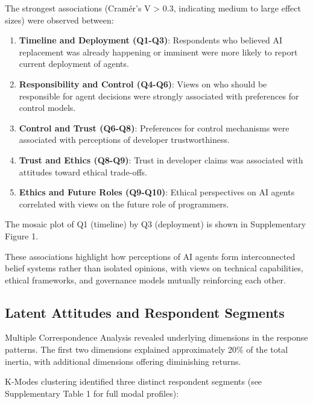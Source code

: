 \documentclass{article}
\begin{document}
The strongest associations (Cramér's V \textgreater{} 0.3, indicating
medium to large effect sizes) were observed between:

\begin{enumerate}
\def\labelenumi{\arabic{enumi}.}
\item
  \textbf{Timeline and Deployment (Q1-Q3)}: Respondents who believed AI
  replacement was already happening or imminent were more likely to
  report current deployment of agents.
\item
  \textbf{Responsibility and Control (Q4-Q6)}: Views on who should be
  responsible for agent decisions were strongly associated with
  preferences for control models.
\item
  \textbf{Control and Trust (Q6-Q8)}: Preferences for control mechanisms
  were associated with perceptions of developer trustworthiness.
\item
  \textbf{Trust and Ethics (Q8-Q9)}: Trust in developer claims was
  associated with attitudes toward ethical trade-offs.
\item
  \textbf{Ethics and Future Roles (Q9-Q10)}: Ethical perspectives on AI
  agents correlated with views on the future role of programmers.
\end{enumerate}

The mosaic plot of Q1 (timeline) by Q3 (deployment) is shown in
Supplementary Figure 1.

These associations highlight how perceptions of AI agents form
interconnected belief systems rather than isolated opinions, with views
on technical capabilities, ethical frameworks, and governance models
mutually reinforcing each other.

\subsection{Latent Attitudes and Respondent
Segments}\label{latent-attitudes-and-respondent-segments}

Multiple Correspondence Analysis revealed underlying dimensions in the
response patterns. The first two dimensions explained approximately 20\%
of the total inertia, with additional dimensions offering diminishing
returns.

K-Modes clustering identified three distinct respondent segments (see
Supplementary Table 1 for full modal profiles):
\end{document}
